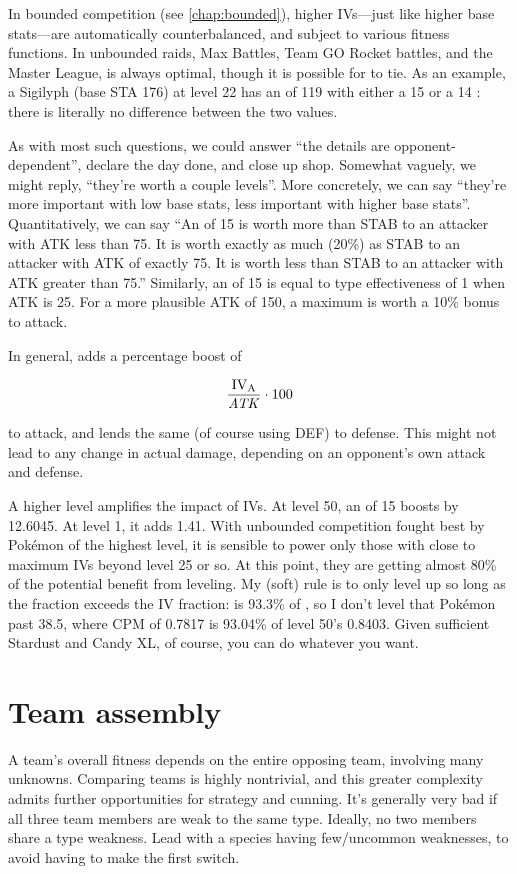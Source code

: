 In bounded competition (see \autoref{chap:bounded}), higher IVs---just like higher
  base stats---are automatically counterbalanced, and subject to various fitness functions.
In unbounded raids, Max Battles, Team GO Rocket battles, and the Master League,
   is always optimal, though it is possible for  to tie.
As an example, a Sigilyph (base STA 176) at level 22 has an \MHP{} of 119 with
  either a 15 or a 14 : there is literally no difference between the two values.

As with most such questions, we could answer ``the details are opponent-dependent'',
  declare the day done, and close up shop.
Somewhat vaguely, we might reply, ``they're worth a couple levels''.
More concretely, we can say ``they're more important with low base stats, less important
  with higher base stats''.
Quantitatively, we can say ``An  of 15 is worth more than STAB to an
  attacker with ATK less than 75. It is worth exactly as much (20\%) as STAB
  to an attacker with ATK of exactly 75. It is worth less than STAB
  to an attacker with ATK greater than 75.''
Similarly, an  of 15 is equal to type effectiveness of 1 when ATK is 25.
For a more plausible ATK of 150, a maximum  is worth a 10\% bonus to attack.

In general,  adds a percentage boost of

\[ \frac{\mbox{$\mathrm{IV_{A}}$}}{\mathit{ATK}} \cdot 100 \]

\noindent{}to attack, and  lends the same (of course using DEF) to defense.
This might not lead to any change in actual damage, depending on an opponent's own attack and defense.

A higher level amplifies the impact of IVs.
At level 50, an  of 15 boosts  by 12.6045.
At level 1, it adds 1.41.
With unbounded competition fought best by Pokémon of the highest level, it is
 sensible to power only those with close to maximum IVs beyond level 25 or so.
At this point, they are getting almost 80\% of the potential benefit from leveling.
My (soft) rule is to only level up so long as the \CPM fraction exceeds the IV fraction:
  is 93.3\% of , so I don't level that Pokémon
 past 38.5, where CPM of 0.7817 is 93.04\% of level 50's 0.8403.
Given sufficient Stardust and Candy XL, of course, you can do whatever you want.

\section{Team assembly}
A team's overall fitness depends on the entire opposing team, involving many unknowns.
Comparing teams is highly nontrivial, and this greater complexity admits
 further opportunities for strategy and cunning.
It's generally very bad if all three team members are weak to the same type.
Ideally, no two members share a type weakness.
Lead with a species having few/uncommon weaknesses, to avoid having to make the first switch.

